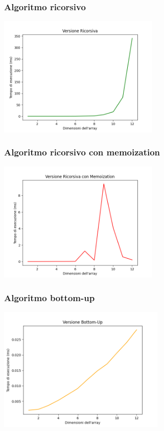 \documentclass{article}
\begin{document}
\subsubsection{Algoritmo ricorsivo}
\includegraphics[width=290px]{plots/Ricorsiva.png}

\subsubsection{Algoritmo ricorsivo con memoization}
\includegraphics[width=290px]{plots/Memoization.png}

\subsubsection{Algoritmo bottom-up}
\includegraphics[width=300px]{plots/Bottom-Up.png}
\end{document}
